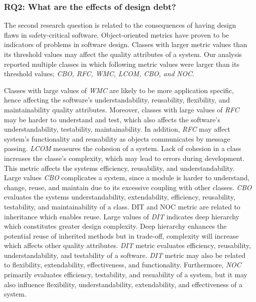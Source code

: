 

\subsubsection{RQ2: What are the effects of design debt?} 
The second research question is related to the consequences of having design flaws in safety-critical software. Object-oriented metrics have proven to be indicators of problems in software design. Classes with larger metric values than its threshold values may affect the quality attributes of a system. Our analysis reported multiple classes in which following metric values were larger than its threshold values; \textit{CBO, RFC, WMC, LCOM, CBO, and NOC}. 

Classes with large values of \textit{WMC} are likely to be more application specific, hence affecting the software's understandability, reusability, flexibility, and maintainability quality attributes\cite{rosenberg1998applying,bansiya2002hierarchical}. Moreover, classes with large values of \textit{RFC} may be harder to understand and test, which also affects the software's understandability, testability, maintainability\cite{rosenberg1998applying}. In addition, \textit{RFC} may affect system's functionality and reusability as objects communicates by message passing\cite{bansiya2002hierarchical}. \textit{LCOM} measures the cohesion of a system. Lack of cohesion in a class increases the classe's complexity, which may lead to errors during development. This metric affects the systems efficiency, reusability, and understandability\cite{rosenberg1998applying,bansiya2002hierarchical}. Large values \textit{CBO} complicates a system, since a module is harder to understand, change, reuse, and maintain due to its excessive coupling with other classes. \textit{CBO} evaluates the systems understandability, extendability, efficiency, reusability, testability, and maintainability of a class\cite{rosenberg1998applying,bansiya2002hierarchical}. DIT and NOC metric are related to inheritance which enables reuse. Large values of \textit{DIT} indicates deep hierarchy which constitutes greater design complexity. Deep hierarchy enhances the potential reuse of inherited methods but in trade-off, complexity will increase which affects other quality attributes. \textit{DIT} metric evaluates efficiency, reusability, understandability, and testability\cite{rosenberg1998applying} of a software. \textit{DIT} metric may also be related to flexibility, extendability, effectiveness, and functionality\cite{bansiya2002hierarchical}. Furthermore, \textit{NOC} primarily evaluates efficiency, testability, and resuability of a system\cite{rosenberg1998applying}, but it may also influence flexibility, understandability, extendability, and effectiveness of a system\cite{bansiya2002hierarchical}.

